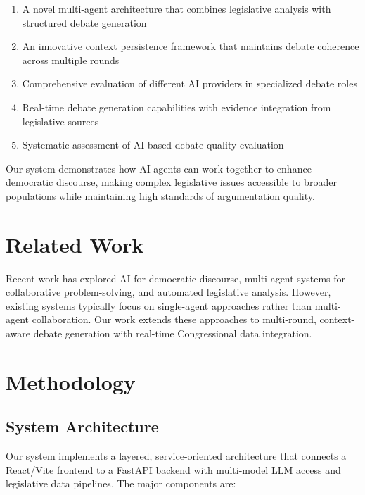 \documentclass{article}
\begin{document}
\begin{enumerate}
    \item A novel multi-agent architecture that combines legislative analysis with structured debate generation
    \item An innovative context persistence framework that maintains debate coherence across multiple rounds
    \item Comprehensive evaluation of different AI providers in specialized debate roles
    \item Real-time debate generation capabilities with evidence integration from legislative sources
    \item Systematic assessment of AI-based debate quality evaluation
\end{enumerate}

Our system demonstrates how AI agents can work together to enhance democratic discourse, making complex legislative issues accessible to broader populations while maintaining high standards of argumentation quality.

\section{Related Work}

Recent work has explored AI for democratic discourse, multi-agent systems for collaborative problem-solving, and automated legislative analysis. However, existing systems typically focus on single-agent approaches rather than multi-agent collaboration. Our work extends these approaches to multi-round, context-aware debate generation with real-time Congressional data integration.

\section{Methodology}

\subsection{System Architecture}

Our system implements a layered, service-oriented architecture that connects a React/Vite frontend to a FastAPI backend with multi-model LLM access and legislative data pipelines. The major components are:
\end{document}
